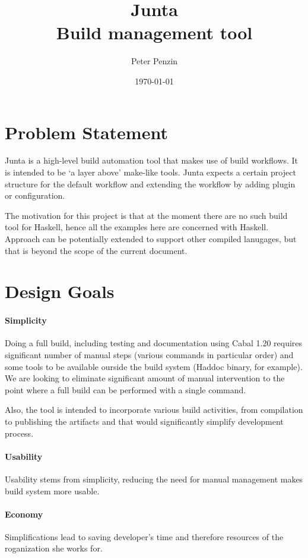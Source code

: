 \documentclass[11pt]{article}
\title{Junta\\Build management tool}
\author{Peter Penzin}
\date{\today}
\begin{document}
\maketitle

\section{Problem Statement}
Junta is a high-level build automation tool that makes use of build workflows.
It is intended to be `a layer above' make-like tools. Junta expects a certain
project structure for the default workflow and extending the workflow by adding
plugin or configuration.

The motivation for this project is that at the moment there are no such build
tool for Haskell, hence all the examples here are concerned with Haskell.
Approach can be potentially extended to support other compiled lanugages, but
that is beyond the scope of the current document.

\section{Design Goals}

\paragraph{Simplicity}
Doing a full build, including testing and documentation using Cabal 1.20
requires significant number of manual steps (various commands in particular
order) and some tools to be available ourside the build system (Haddoc binary,
for example). We are looking to eliminate significant amount of manual
intervention to the point where a full build can be performed with a single
command.

Also, the tool is intended to incorporate various build activities, from
compilation to publishing the artifacts and that would significantly simplify
development process.

\paragraph{Usability}
Usability stems from simplicity, reducing the need for manual management makes build system more usable.

\paragraph{Economy}
Simplifications lead to saving developer's time and therefore resources of the
roganization she works for.
\end{document}
